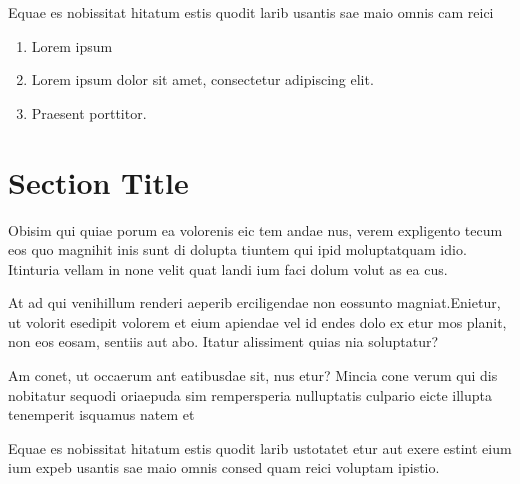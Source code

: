 \documentclass[
]{ImperialPoster}
\begin{document}
\begin{multicols}{3}

	Equae es nobissitat hitatum estis quodit larib usantis sae maio omnis cam reici


	\begin{enumerate}
		\item Lorem ipsum
		\item Lorem ipsum dolor sit amet, consectetur adipiscing elit.
		\item Praesent porttitor.
	\end{enumerate}

	\columnbreak{} %


	\section{Section Title}

	{
		\small %
		Obisim qui quiae porum ea volorenis eic tem andae nus, verem expligento tecum eos quo magnihit inis sunt di dolupta tiuntem qui ipid moluptatquam idio. Itinturia vellam in none velit quat landi ium faci dolum volut as ea cus.

		At ad qui venihillum renderi aeperib erciligendae non eossunto magniat.Enietur, ut volorit esedipit volorem et eium apiendae vel id endes dolo ex etur mos planit, non eos eosam, sentiis aut abo. Itatur alissiment quias nia soluptatur?

		Am conet, ut occaerum ant eatibusdae sit, nus etur? Mincia cone verum qui dis nobitatur sequodi oriaepuda sim rempersperia nulluptatis culpario eicte illupta tenemperit isquamus natem et\par
	}

	Equae es nobissitat hitatum estis quodit larib ustotatet \textcolor{ICLBlue}{etur aut exere estint eium ium expeb} usantis sae maio omnis consed quam reici voluptam ipistio.

	\vspace{0.31\textheight} %


\end{multicols}
\end{document}

